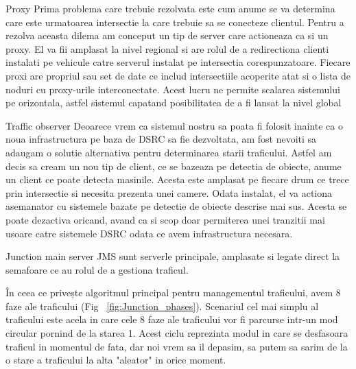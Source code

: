 \documentclass{beamer}
\begin{document}
    \begin{frame}{Proxy}
        Prima problema care trebuie rezolvata este cum anume se va 
        determina care este urmatoarea intersectie la care trebuie 
        sa se conecteze clientul. Pentru a rezolva aceasta dilema 
        am conceput un tip de server care actioneaza ca si un proxy. 
        El va fii amplasat la nivel regional si are rolul de a redirectiona 
        clienti instalati pe vehicule catre serverul instalat pe 
        intersectia corespunzatoare.
        Fiecare proxi are propriul sau set de date ce includ intersectiile 
        acoperite atat si o lista de noduri cu proxy-urile interconectate.
        Acest lucru ne permite scalarea sistemului pe orizontala, astfel 
        sistemul capatand posibilitatea de a fi lansat la nivel global 
    \end{frame}
    \begin{frame}{Traffic observer}
        Deoarece vrem ca sistemul nostru sa poata fi folosit inainte ca 
        o noua infrastructura pe baza de DSRC
        sa fie dezvoltata, am fost nevoiti sa adaugam o solutie alternativa 
        pentru determinarea starii traficului. Astfel am decis sa cream 
        un nou tip de client, ce se bazeaza pe detectia de obiecte, anume 
        un client ce poate detecta masinile. Acesta este amplasat pe 
        fiecare drum ce trece prin intersectie si necesita prezenta unei 
        camere. Odata instalat, el va actiona asemanator cu sistemele 
        bazate pe detectie de obiecte descrise mai sus. Acesta se poate 
        dezactiva oricand, avand ca si scop doar permiterea unei tranzitii 
        mai usoare catre sistemele DSRC odata ce avem infrastructura necesara.
    \end{frame}

    \begin{frame}{Junction main server}
        JMS sunt serverle principale, amplasate si legate direct la 
        semafoare ce au rolul de a gestiona traficul.
        
        În ceea ce privește algoritmul principal pentru managementul traficului,
        avem 8 faze ale traficului (Fig ~\ref{fig:Junction_phases}). 
        Scenariul cel mai simplu al traficului este acela in care cele 
        8 faze ale traficului vor fi parcurse intr-un mod circular pornind de
        la starea 1. Acest ciclu reprezinta modul in care se desfasoara 
        traficul in momentul de fata, dar noi vrem sa il depasim, sa putem sa sarim de la 
        o stare a traficului la alta "aleator" in orice moment.
        
    \end{frame}
\end{document}
